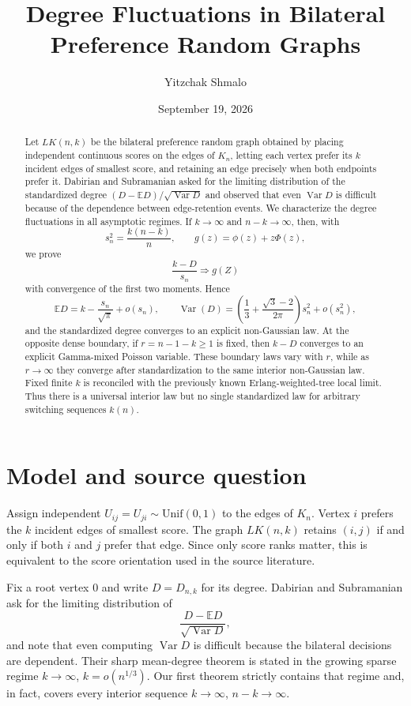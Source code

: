 \documentclass[11pt]{article}
\title{Degree Fluctuations in Bilateral Preference Random Graphs}
\author{Yitzchak Shmalo}
\date{September 19, 2026}
\theoremstyle{remark}
\newcommand{\E}{\mathbb E}
\newcommand{\Var}{\operatorname{Var}}
\newcommand{\1}{\mathbf 1}
\begin{document}
\maketitle

\begin{abstract}
Let $LK(n,k)$ be the bilateral preference random graph obtained by placing independent continuous scores on the edges of $K_n$, letting each vertex prefer its $k$ incident edges of smallest score, and retaining an edge precisely when both endpoints prefer it. Dabirian and Subramanian asked for the limiting distribution of the standardized degree $(D-\E D)/\sqrt{\Var D}$ and observed that even $\Var D$ is difficult because of the dependence between edge-retention events. We characterize the degree fluctuations in all asymptotic regimes. If $k\to\infty$ and $n-k\to\infty$, then, with
\[
s_n^2=\frac{k(n-k)}n,
\qquad g(z)=\phi(z)+z\Phi(z),
\]
we prove
\[
\frac{k-D}{s_n}\Longrightarrow g(Z)
\]
with convergence of the first two moments. Hence
\[
\E D=k-\frac{s_n}{\sqrt\pi}+o(s_n),
\qquad
\Var(D)=\left(\frac13+\frac{\sqrt3-2}{2\pi}\right)s_n^2+o(s_n^2),
\]
and the standardized degree converges to an explicit non-Gaussian law. At the opposite dense boundary, if $r=n-1-k\ge1$ is fixed, then $k-D$ converges to an explicit Gamma-mixed Poisson variable. These boundary laws vary with $r$, while as $r\to\infty$ they converge after standardization to the same interior non-Gaussian law. Fixed finite $k$ is reconciled with the previously known Erlang-weighted-tree local limit. Thus there is a universal interior law but no single standardized law for arbitrary switching sequences $k(n)$.
\end{abstract}

\section{Model and source question}

Assign independent $U_{ij}=U_{ji}\sim\mathrm{Unif}(0,1)$ to the edges of $K_n$. Vertex $i$ prefers the $k$ incident edges of smallest score. The graph $LK(n,k)$ retains $(i,j)$ if and only if both $i$ and $j$ prefer that edge. Since only score ranks matter, this is equivalent to the score orientation used in the source literature.

Fix a root vertex $0$ and write $D=D_{n,k}$ for its degree. Dabirian and Subramanian ask for the limiting distribution of
\[
\frac{D-\E D}{\sqrt{\Var D}},
\]
and note that even computing $\Var D$ is difficult because the bilateral decisions are dependent. Their sharp mean-degree theorem is stated in the growing sparse regime $k\to\infty$, $k=o(n^{1/3})$. Our first theorem strictly contains that regime and, in fact, covers every interior sequence $k\to\infty$, $n-k\to\infty$.
\end{document}

